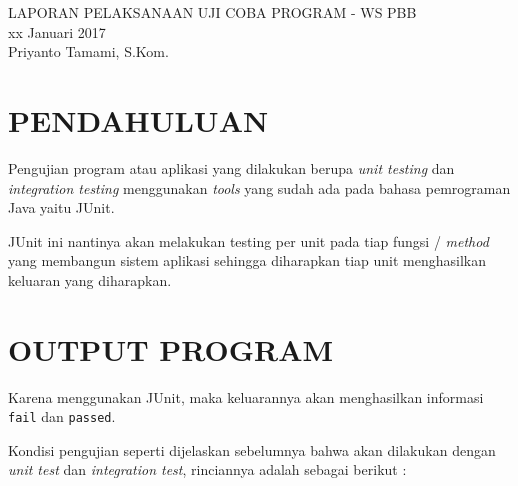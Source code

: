 \documentclass[pdftex,12pt, oneside]{article}
\begin{document}
\sloppy %

\begin{center}
{\large LAPORAN PELAKSANAAN UJI COBA PROGRAM - WS PBB}
\\[1cm]
xx Januari 2017\\
Priyanto Tamami, S.Kom.
\end{center}




\section{PENDAHULUAN}

Pengujian program atau aplikasi yang dilakukan berupa \textit{unit testing} dan \textit{integration testing} menggunakan \textit{tools} yang sudah ada pada bahasa pemrograman Java yaitu JUnit.

JUnit ini nantinya akan melakukan testing per unit pada tiap fungsi / \textit{method} yang membangun sistem aplikasi sehingga diharapkan tiap unit menghasilkan keluaran yang diharapkan.

\section{OUTPUT PROGRAM}

Karena menggunakan JUnit, maka keluarannya akan menghasilkan informasi \texttt{fail} dan \texttt{passed}.

Kondisi pengujian seperti dijelaskan sebelumnya bahwa akan dilakukan dengan \textit{unit test} dan \textit{integration test}, rinciannya adalah sebagai berikut :
\end{document}
